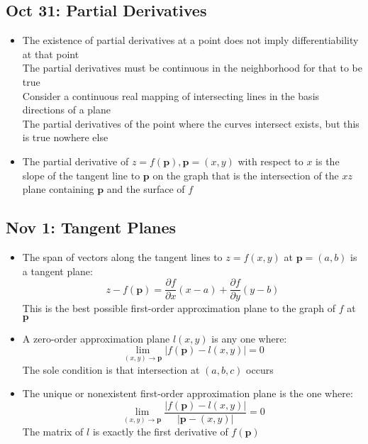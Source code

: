 \documentclass[10pt, oneside]{article}
\newcommand{\del}{\partial}
\renewcommand{\vec}[1]{\mathbf{#1}}
\begin{document}
\subsection{Oct 31: Partial Derivatives}
\begin{itemize}
    \item The existence of partial derivatives at a point does not imply differentiability at that point\\
        The partial derivatives must be continuous in the neighborhood for that to be true\\
        Consider a continuous real mapping of intersecting lines in the basis directions of a plane\\
        The partial derivatives of the point where the curves intersect exists, but this is true nowhere else
    \item The partial derivative of $z = f(\vec{p}), \vec{p} = (x,y)$ with respect to $x$ is the slope of the tangent line to $\vec{p}$ on the graph that is the intersection of the $xz$ plane containing $\vec{p}$ and the surface of $f$
\end{itemize}

\subsection{Nov 1: Tangent Planes}
\begin{itemize}
    \item The span of vectors along the tangent lines to $z = f(x,y)$ at $\vec{p} = (a,b)$ is a tangent plane:
        \[z - f(\vec{p}) = \frac{\del f}{\del x}(x-a) + \frac{\del f}{\del y}(y-b)\]
        This is the best possible first-order approximation plane to the graph of $f$ at $\vec{p}$
    \item A zero-order approximation plane $l(x,y)$ is any one where:
        \[\lim_{(x,y) \rightarrow \vec{p}} |f(\vec{p}) - l(x,y)| = 0\]
        The sole condition is that intersection at $(a,b,c)$ occurs
    \item The unique or nonexistent first-order approximation plane is the one where:
        \[\lim_{(x,y) \rightarrow \vec{p}} \frac{|f(\vec{p}) - l(x,y)|}{|\vec{p} - (x,y)|} = 0\]
        The matrix of $l$ is exactly the first derivative of $f(\vec{p})$
\end{itemize}
\end{document}

